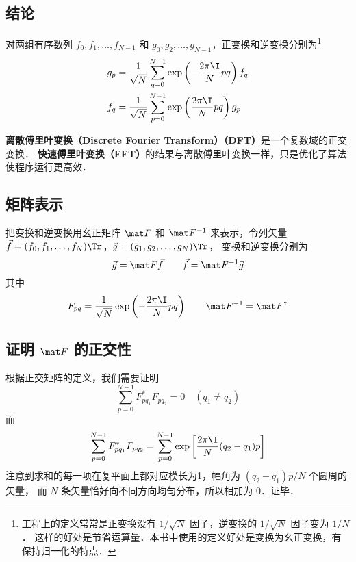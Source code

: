 
\subsection{结论}

对两组有序数列 $f_0,f_1,\dots,f_{N-1}$ 和 $g_0,g_2,\dots,g_{N-1}$，正变换和逆变换分别为\footnote{工程上的定义常常是正变换没有 $1/\sqrt{N}$ 因子，逆变换的 $1/\sqrt{N}$ 因子变为 $1/N$． 这样的好处是节省运算量．本书中使用的定义好处是变换为幺正变换，有保持归一化的特点．}
\begin{align}
g_p &= \frac{1}{\sqrt{N}}\sum\limits_{q=0}^{N-1} \exp\left(-\frac{2\pi\I}{N} p q \right) f_q \\
f_q &= \frac{1}{\sqrt{N}}\sum\limits_{p=0}^{N-1} \exp\left(\frac{2\pi\I}{N} p q\right) g_p
\end{align}

\textbf{离散傅里叶变换（Discrete Fourier Transform）（DFT）}是一个复数域的正交变换．%
\textbf{快速傅里叶变换（FFT）}的结果与离散傅里叶变换一样，只是优化了算法使程序运行更高效．

\subsection{矩阵表示}
把变换和逆变换用幺正矩阵 $\mat F$ 和 $\mat F^{-1}$ 来表示，令列矢量 $\vec f = (f_0,f_1,\dots,f_N)\Tr$，$\vec g = (g_1,g_2,\dots,g_N)\Tr$， 变换和逆变换分别为
\begin{equation}
\vec g = \mat F \vec f \qquad
\vec f = \mat F^{-1} \vec g
\end{equation}
其中
\begin{equation}
F_{pq} = \frac{1}{\sqrt{N}} \exp\left(-\frac{2\pi\I}{N} p q \right) \qquad
\mat F^{-1} = \mat F^\dag
\end{equation}

\subsection{证明 $\mat F$ 的正交性}
根据正交矩阵的定义，我们需要证明
\begin{equation}
\sum\limits_{p=0}^{N-1} F^*_{pq_1}F_{pq_2} = 0 \quad (q_1 \ne q_2)
\end{equation}
而
\begin{equation}\label{DFT_eq1}
\sum\limits_{p=0}^{N-1} F^*_{pq_1}F_{pq_2}
= \sum\limits_{p=0}^{N-1} \exp\left[\frac{2\pi\I}{N} (q_2-q_1) p \right]
\end{equation}
注意到求和的每一项在复平面上都对应模长为1，幅角为 $(q_2-q_1)p/N$ 个圆周的矢量，%
而 $N$ 条矢量恰好向不同方向均匀分布，所以相加为 $0$．证毕．

